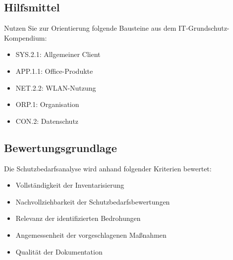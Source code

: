 \documentclass{orgstandard}
\begin{document}
\subsection{Hilfsmittel}
\label{sec:org08d003e}

Nutzen Sie zur Orientierung folgende Bausteine aus dem IT-Grundschutz-Kompendium:
\begin{itemize}
\item SYS.2.1: Allgemeiner Client
\item APP.1.1: Office-Produkte
\item NET.2.2: WLAN-Nutzung
\item ORP.1: Organisation
\item CON.2: Datenschutz
\end{itemize}

\subsection{Bewertungsgrundlage}
\label{sec:org373f0a7}

Die Schutzbedarfsanalyse wird anhand folgender Kriterien bewertet:
\begin{itemize}
\item Vollständigkeit der Inventarisierung
\item Nachvollziehbarkeit der Schutzbedarfsbewertungen
\item Relevanz der identifizierten Bedrohungen
\item Angemessenheit der vorgeschlagenen Maßnahmen
\item Qualität der Dokumentation
\end{itemize}
\end{document}
